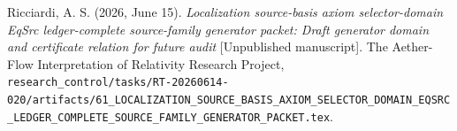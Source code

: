 \documentclass[11pt]{article}
\begin{document}
Ricciardi, A. S. (2026, June 15). \emph{Localization source-basis axiom
selector-domain EqSrc ledger-complete source-family generator packet:
Draft generator domain and certificate relation for future audit}
[Unpublished manuscript]. The Aether-Flow Interpretation of
Relativity Research Project,
\texttt{research\_control/tasks/RT-20260614-020/artifacts/61\_LOCALIZATION\_SOURCE\_BASIS\_AXIOM\_SELECTOR\_DOMAIN\_EQSRC\_LEDGER\_COMPLETE\_SOURCE\_FAMILY\_GENERATOR\_PACKET.tex}.
\end{document}
